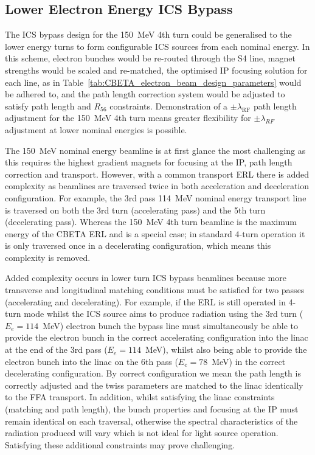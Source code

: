 \documentclass[../main.tex]{subfiles}
\begin{document}
\subsection{Lower Electron Energy ICS Bypass}

The ICS bypass design for the 150~\si{\mega\electronvolt} 4th turn could be generalised to the lower energy turns to form configurable ICS sources from each nominal energy. In this scheme, electron bunches would be re-routed through the S4 line, magnet strengths would be scaled and re-matched, the optimised IP focusing solution for each line, as in Table~\ref{tab:CBETA_electron_beam_design_parameters} would be adhered to, and the path length correction system would be adjusted to satisfy path length and $R_{56}$ constraints. Demonstration of a $\pm\lambda_{\mathrm{RF}}$ path length adjustment for the 150~\si{\mega\electronvolt} 4th turn means greater flexibility for $\pm\lambda_{RF}$ adjustment at lower nominal energies is possible.

The 150~\si{\mega\electronvolt} nominal energy beamline is at first glance the most challenging as this requires the highest gradient magnets for focusing at the IP, path length correction and transport. However, with a common transport ERL there is added complexity as beamlines are traversed twice in both acceleration and deceleration configuration. For example, the 3rd pass 114~\si{\mega\electronvolt} nominal energy transport line is traversed on both the 3rd turn (accelerating pass) and the 5th turn (decelerating pass). Whereas the 150~\si{\mega\electronvolt} 4th turn beamline is the maximum energy of the CBETA ERL and is a special case; in standard 4-turn operation it is only traversed once in a decelerating configuration, which means this complexity is removed.

Added complexity occurs in lower turn ICS bypass beamlines because more transverse and longitudinal matching conditions must be satisfied for two passes (accelerating and decelerating). For example, if the ERL is still operated in 4-turn mode whilst the ICS source aims to produce radiation using the 3rd turn ($E_{e}=114$~\si{\mega\electronvolt}) electron bunch the bypass line must simultaneously be able to provide the electron bunch in the correct accelerating configuration into the linac at the end of the 3rd pass ($E_{e} = 114$~\si{\mega\electronvolt}), whilst also being able to provide the electron bunch into the linac on the 6th pass ($E_{e} = 78$~\si{\mega\electronvolt}) in the correct decelerating configuration. By correct configuration we mean the path length is correctly adjusted and the twiss parameters are matched to the linac identically to the FFA transport. In addition, whilst satisfying the linac constraints (matching and path length), the bunch properties and focusing at the IP must remain identical on each traversal, otherwise the spectral characteristics of the radiation produced will vary which is not ideal for light source operation. Satisfying these additional constraints may prove challenging.
\end{document}

